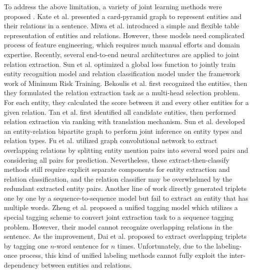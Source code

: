 \documentclass{ecai}
\begin{document}
To address the above limitation, a variety of joint learning methods were proposed \cite{gupta2016table,katiyar2017going,li2019entity,takanobu2019hierarchical,zhang2017end}. 
Kate et al. \cite{kate2010joint} presented a card-pyramid graph to represent entities and their relations in a sentence.
Miwa et al. \cite{miwa2014modeling} introduced a simple and flexible table representation of entities and relations.
However, these models need complicated process of feature engineering, which requires much manual efforts and domain expertise. 
Recently, several end-to-end neural architectures are applied to joint relation extraction.
Sun et al. \cite{sun2018extracting} optimized a global loss function to jointly train entity recognition model and relation classification model under the framework work of Minimum Risk Training.
Bekoulis et al. \cite{bekoulis2018adversarial,bekoulis2018joint} first recognized the entities, then they formulated the relation extraction task as a multi-head selection problem. For each entity, they calculated the score between it and every other entities for a given relation.
Tan et al. \cite{tan2019jointly} first identified all candidate entities, then performed relation extraction via ranking with translation mechanism.
Sun et al. \cite{sun2019joint} developed an entity-relation bipartite graph to perform joint inference on entity types and relation types. 
Fu et al. \cite{fu-etal-2019-graphrel} utilized graph convolutional network to extract overlapping relations by splitting entity mention pairs into several word pairs and considering all pairs for prediction.
Nevertheless, these extract-then-classify methods still require explicit separate components for entity extraction and relation classification, and the relation classifier may be overwhelmed by the redundant extracted entity pairs.
Another line of work \cite{zeng-etal-2019-learning,zeng2018extracting} directly generated triplets one by one by a sequence-to-sequence model but fail to extract an entity that has multiple words.
Zheng et al. \cite{zheng2017joint} proposed a unified tagging model which utilizes a special tagging scheme to convert joint extraction task to a sequence tagging problem. However, their model cannot recognize overlapping relations in the sentence.
As the improvement, Dai et al. \cite{dai2019joint} proposed to extract overlapping triplets by tagging one $n$-word sentence for $n$ times. 
Unfortunately, due to the labeling-once process, this kind of unified labeling methods cannot fully exploit the inter-dependency between entities and relations.
\end{document}
